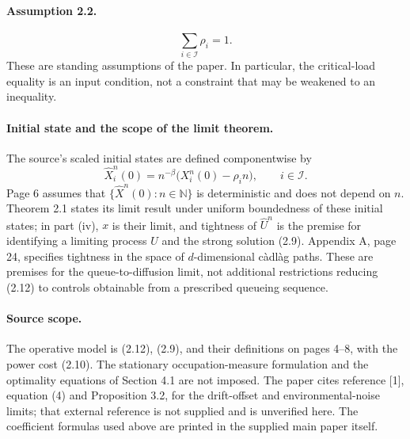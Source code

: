 \documentclass{article}
\begin{document}
\paragraph{Assumption 2.2.}
\[
\sum_{i\in\mathcal I}\rho_i=1.
\]
These are standing assumptions of the paper. In particular, the critical-load equality is an input condition, not a constraint that may be weakened to an inequality.

\paragraph{Initial state and the scope of the limit theorem.}
The source's scaled initial states are defined componentwise by
\[
\hat X_i^n(0)=n^{-\beta}\bigl(X_i^n(0)-\rho_i n\bigr),\qquad i\in\mathcal I.
\]
Page 6 assumes that \(\{\hat X^n(0):n\in\mathbb N\}\) is deterministic and does not depend on \(n\). Theorem 2.1 states its limit result under uniform boundedness of these initial states; in part (iv), \(x\) is their limit, and tightness of \(\hat U^n\) is the premise for identifying a limiting process \(\hat U\) and the strong solution (2.9). Appendix A, page 24, specifies tightness in the space of \(d\)-dimensional c\`adl\`ag paths. These are premises for the queue-to-diffusion limit, not additional restrictions reducing (2.12) to controls obtainable from a prescribed queueing sequence.

\paragraph{Source scope.}
The operative model is (2.12), (2.9), and their definitions on pages 4--8, with the power cost (2.10). The stationary occupation-measure formulation and the optimality equations of Section 4.1 are not imposed. The paper cites reference [1], equation (4) and Proposition 3.2, for the drift-offset and environmental-noise limits; that external reference is not supplied and is unverified here. The coefficient formulas used above are printed in the supplied main paper itself.
\end{document}

